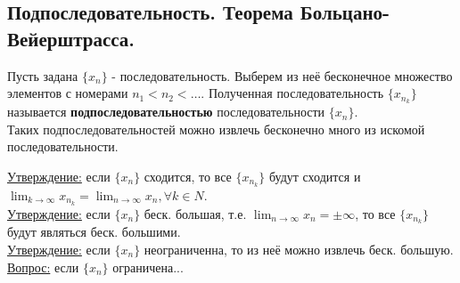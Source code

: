 \documentclass[12pt]{article}
\begin{document}
    \subsection{Подпоследовательность. Теорема Больцано-Вейерштрасса.}
    \noindent Пусть задана $\{x_n\}$ - последовательность. Выберем из неё бесконечное множество элементов с номерами $n_{1} < n_{2} < \dots$. Полученная последовательность $\{x_{n_{k}}\}$ называется \textbf{подпоследовательностью} последовательности $\{x_n\}$.\\
    Таких подпоследовательностей можно извлечь бесконечно много из искомой последовательности.\par\noindent
    \underline{Утверждение:} если $\{x_n\}$ сходится, то все $\{x_{n_{k}}\}$ будут сходится и $\lim_{k\to\infty} x_{n_{k}} = \lim_{n\to\infty} x_n, \forall k \in N$.\\
    \underline{Утверждение:} если $\{x_n\}$ беск. большая, т.е. $\lim_{n\to\infty}x_n = \pm \infty$, то все $\{x_{n_{k}}\}$ будут являться беск. большими.\\
    \underline{Утверждение:} если $\{x_n\}$ неограниченна, то из неё можно извлечь беск. большую.\\
    \underline{Вопрос:} если $\{x_n\}$ ограничена...\\
    
\end{document}
